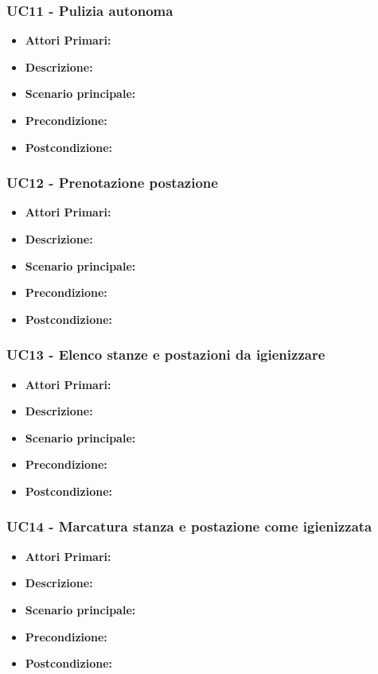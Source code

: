 \subsubsection{ UC11 - Pulizia autonoma}
\begin{itemize}
           	\item\textbf{Attori Primari:} 
           	\item\textbf{Descrizione:} 
           	\item\textbf{Scenario principale:} 
           	\item\textbf{Precondizione:} 
           	\item\textbf{Postcondizione:}
\end{itemize}

\subsubsection{ UC12 - Prenotazione postazione}
\begin{itemize}
           	\item\textbf{Attori Primari:} 
           	\item\textbf{Descrizione:} 
           	\item\textbf{Scenario principale:} 
           	\item\textbf{Precondizione:} 
           	\item\textbf{Postcondizione:}
\end{itemize}

\subsubsection{ UC13 - Elenco stanze e postazioni da igienizzare}
\begin{itemize}
           	\item\textbf{Attori Primari:} 
           	\item\textbf{Descrizione:} 
           	\item\textbf{Scenario principale:} 
           	\item\textbf{Precondizione:} 
           	\item\textbf{Postcondizione:}
\end{itemize}

\subsubsection{ UC14 - Marcatura stanza e postazione come igienizzata}
\begin{itemize}
           	\item\textbf{Attori Primari:} 
           	\item\textbf{Descrizione:} 
           	\item\textbf{Scenario principale:} 
           	\item\textbf{Precondizione:} 
           	\item\textbf{Postcondizione:}
\end{itemize}